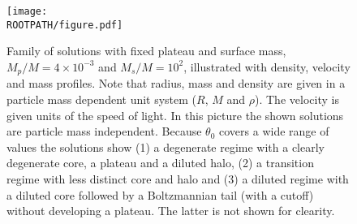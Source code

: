 \begin{figure}%
	\centering%
	\texttt{[image: \\ROOTPATH/figure.pdf]}
	\caption{Family of solutions with fixed plateau and surface mass, $M_p/M = 4 \times 10^{-3}$ and $M_s/M = 10^{2}$, illustrated with density, velocity and mass profiles. Note that radius, mass and density are given in a particle mass dependent unit system ($R$, $M$ and $\rho$). The velocity is given units of the speed of light. In this picture the shown solutions are particle mass independent. Because $\theta_0$ covers a wide range of values the solutions show (1) a degenerate regime with a clearly degenerate core, a plateau and a diluted halo, (2) a transition regime with less distinct core and halo and (3) a diluted regime with a diluted core followed by a Boltzmannian tail (with a cutoff) without developing a plateau. The latter is not shown for clearity.}%
	\label{fig:profiles:without-cutoff:MpMs:raw}%
\end{figure}